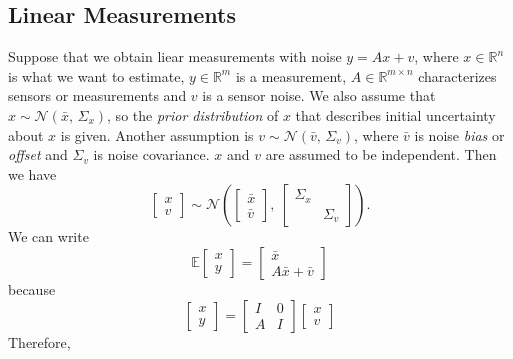 \documentclass{article}[12pt]
\def\E{\E}
\def\v{\mathbf{v}}
\def\y{\mathbf{y}}
\def \E{\mathbb E}
\begin{document}
\subsection{Linear Measurements}
Suppose that we obtain liear measurements with noise $y=Ax+v$,
where $x\in\mathbb{R}^n$ is what we want to estimate, $y\in\mathbb{R}^m$ is a measurement, $A\in\mathbb{R}^{m\times n}$ characterizes sensors or measurements and $v$ is a sensor noise. We also assume that $x\sim\mathcal{N}(\bar{x},\,\Sigma_x)$, so the \textit{prior distribution} of $x$ that describes initial uncertainty
about $x$ is given. Another assumption is $v\sim\mathcal{N}(\bar{v},\,\Sigma_v)$, where $\bar{v}$ is noise \textit{bias} or \textit{offset} and $\Sigma_v$ is noise covariance. $x$ and $v$ are assumed to be independent.
Then we have
\begin{equation}
\begin{bmatrix}
x\\v
\end{bmatrix}
\sim\mathcal{N}
\left(
\begin{bmatrix}
\bar{x}\\\bar{v}
\end{bmatrix},\ 
\begin{bmatrix}
\Sigma_x & \\
& \Sigma_v
\end{bmatrix}
\right).
\end{equation}
We can write
\begin{equation}
\E \begin{bmatrix}
x \\ y
\end{bmatrix} = 
\begin{bmatrix}
\bar{x} \\ A\bar{x}+ \bar{v}
\end{bmatrix}
\end{equation}
because 
\begin{equation}
\begin{bmatrix}
x\\y
\end{bmatrix}
=
\begin{bmatrix}
I & 0\\
A & I
\end{bmatrix}
\begin{bmatrix}
x \\ v
\end{bmatrix}
\end{equation}
Therefore, 
\end{document}
